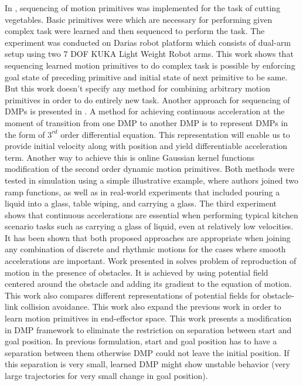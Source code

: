 \newline
In \cite{lioutikov2016learning}, sequencing of motion primitives was implemented for the task of cutting vegetables. Basic primitives were which are necessary for performing given complex task were learned and then sequenced to perform the task. The experiment was conducted on Darias robot platform which consists of dual-arm setup using two 7 DOF KUKA Light Weight Robot arms. This work shows that sequencing learned motion primitives to do complex task is possible by enforcing goal state of preceding primitive and initial state of next primitive to be same. But this work doesn't specify any method for combining arbitrary motion primitives in order to do entirely new task. 
\newline
Another approach for sequencing of DMPs is presented in \cite{nemec2012action}. A method for achieving continuous acceleration at the moment of transition from one DMP to another DMP is to represent DMPs in the form of $3^{rd}$ order differential equation. This representation will enable us to provide initial velocity along with position and yield differentiable acceleration term. Another way to achieve this is online Gaussian kernel functions modification of the second order dynamic motion primitives. Both methods were tested in simulation using a simple illustrative example, where authors joined two ramp functions, as well as in real-world experiments that included pouring a liquid into a glass, table wiping, and carrying a glass. The third experiment shows that continuous accelerations are essential when performing typical kitchen scenario tasks such as carrying a glass of liquid, even at relatively low velocities. It has been shown that both proposed approaches are appropriate when joining any combination of discrete and rhythmic motions for the cases where smooth accelerations are important.
\newline 
Work presented in \cite{park2008movement} solves problem of reproduction of motion in the presence of obstacles. It is achieved by using potential field centered around the obstacle and adding its gradient to the equation of motion. This work also compares different representations of potential fields for obstacle-link collision avoidance. This work also expand the previous work in order to learn motion primitives in end-effector space. This work presents a modification in DMP framework to eliminate the restriction on separation between start and goal position. In previous formulation, start and goal position has to have a separation between them otherwise DMP could not leave the initial position. If this separation is very small, learned DMP might show unstable behavior (very large trajectories for very small change in goal position). 
